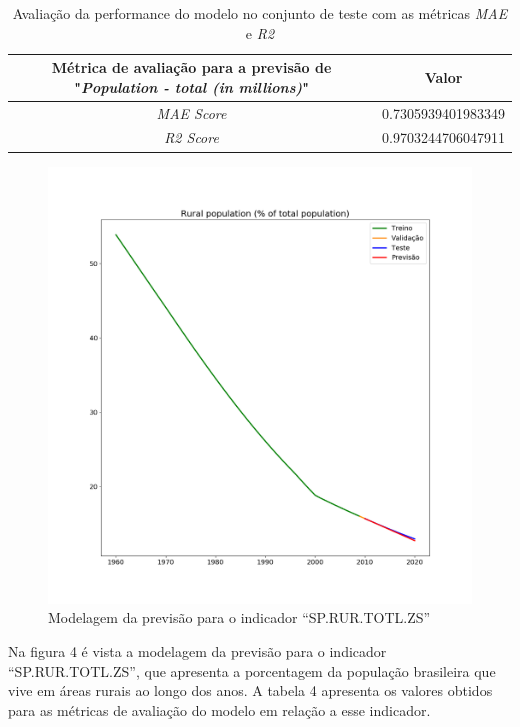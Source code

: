 \begin{table}[H]
    \centering
    \begin{tabular}{|c|c|}
        \hline
        \multicolumn{1}{|p{5cm}|}{Métrica de avaliação para a previsão de "\emph{Population - total (in millions)}"} & Valor \\
        \hline 
        \emph{MAE Score} & 0.7305939401983349 \\
        \hline
        \emph{R2 Score} &  0.9703244706047911 \\
        \hline
    \end{tabular}
    \caption{Avaliação da performance do modelo no conjunto de teste com as métricas \emph{MAE} e \emph{R2}}
\end{table}

\begin{figure}[H]
    \centering
    \includegraphics[scale=0.35]{images/Figure_2}
    \caption{Modelagem da previsão para o indicador ``SP.RUR.TOTL.ZS''}
\end{figure}

Na figura 4 é vista a modelagem da previsão para o indicador ``SP.RUR.TOTL.ZS'', 
que apresenta a porcentagem da população brasileira que vive em áreas rurais ao longo dos anos. 
A tabela 4 apresenta os valores obtidos para as métricas de avaliação do modelo em relação a esse indicador.

